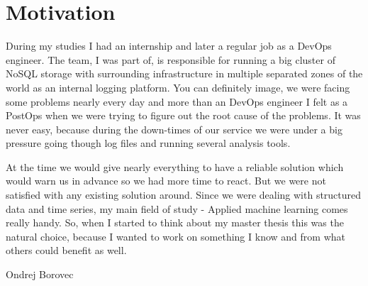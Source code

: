 \chapter*{Motivation}

During my studies I had an internship and later a regular job as a DevOps engineer. The team, I was part of, is responsible for running a big cluster of NoSQL storage with surrounding infrastructure in multiple separated zones of the world as an internal logging platform. You can definitely image, we were facing some problems nearly every day and more than an DevOps engineer I felt as a PostOps when we were trying to figure out the root cause of the problems. It was never easy, because during the down-times of our service we were under a big pressure going though log files and running several analysis tools.

At the time we would give nearly everything to have a reliable solution which would warn us in advance so we had more time to react. But we were not satisfied with any existing solution around. Since we were dealing with structured data and time series, my main field of study - Applied machine learning comes really handy. So, when I started to think about my master thesis this was the natural choice, because I wanted to work on something I know and from what others could benefit as well.

\vspace{20mm}
\begin{flushright}
Ondrej Borovec
\end{flushright}